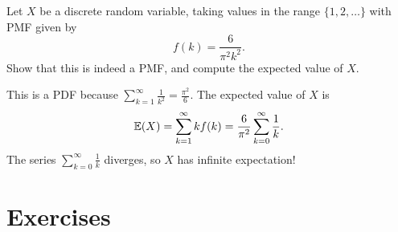 %
%
%
%
%
\begin{example}
Let $X$ be a discrete random variable, taking values in the range $\{1,2,\ldots\}$ with PMF given by
\[
f(k) = \frac{6}{\pi^2 k^2}.
\]
Show that this is indeed a PMF, and compute the expected value of $X$.
\end{example}

\begin{solution}
This is a PDF because $\displaystyle\sum_{k=1}^{\infty} \frac{1}{k^2} = \frac{\pi^2}{6}$.
The expected value of $X$ is
\begin{align*}
\mathbb{E}(X) 
	= \sum_{k=1}^{\infty} k f(k)
	= \frac{6}{\pi^2}\sum_{k=0}^{\infty}\frac{1}{k}.
\end{align*}
The series $\displaystyle \sum_{k=0}^{\infty}\frac{1}{k}$ diverges, so $X$ has infinite expectation!
\end{solution}


\section{Exercises}


\endinput
